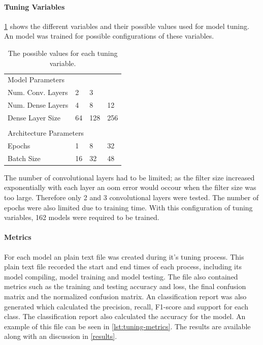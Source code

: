 \documentclass[12pt]{article}
\begin{document}
\paragraph{Tuning Variables}\label{variables}

\ref{tab:variables} shows the different variables and their possible values used for model tuning. An model was trained for possible configurations of these variables.

\begin{table}[H]
\centering
\begin{tabular}{llll}
\multicolumn{4}{l}{Model Parameters}        \\
Num. Conv. Layers    & 2     & 3     &      \\
Num. Dense Layers    & 4     & 8     & 12   \\
Dense Layer Size     & 64    & 128   & 256  \\ 
& & & \\
\multicolumn{4}{l}{Architecture Parameters} \\
Epochs               & 1     & 8     & 32   \\
Batch Size           & 16    & 32    & 48  
\end{tabular}
\caption{The possible values for each tuning variable.}
\label{tab:variables}
\end{table}

The number of convolutional layers had to be limited; as the filter size increased exponentially with each layer an \acrfull{oom} error would occour when the filter size was too large. Therefore only 2 and 3 convolutional layers were tested. The number of epochs were also limited due to training time. With this configuration of tuning variables, 162 models were required to be trained.

\paragraph{Metrics}

For each model an plain text file was created during it's tuning process. This plain text file recorded the start and end times of each process, including its model compiling, model training and model testing. The file also contained metrics such as the training and testing accuracy and loss, the final confusion matrix and the normalized confusion matrix. An classification report was also generated which calculated the precision, recall, F1-score and support for each class. The classification report also calculated the accuracy for the model. An example of this file can be seen in \ref{lst:tuning-metrics}. The results are available along with an discussion in \ref{results}.
\end{document}

